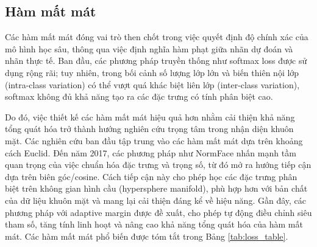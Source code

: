 \subsection{Hàm mất mát}
Các hàm mất mát đóng vai trò then chốt trong việc quyết định độ chính xác của mô hình học sâu, thông qua việc định nghĩa hàm phạt giữa nhãn dự đoán và nhãn thực tế\cite{sota_GUO2019102805}. Ban đầu, các phương pháp truyền thống như softmax loss được sử dụng rộng rãi; tuy nhiên, trong bối cảnh số lượng lớp lớn và biến thiên nội lớp (intra-class variation) có thể vượt quá khác biệt liên lớp (inter-class variation), softmax không đủ khả năng tạo ra các đặc trưng có tính phân biệt cao\cite{20_WANG2021215}.

Do đó, việc thiết kế các hàm mất mát hiệu quả hơn nhằm cải thiện khả năng tổng quát hóa trở thành hướng nghiên cứu trọng tâm trong nhận diện khuôn mặt. Các nghiên cứu ban đầu tập trung vào các hàm mất mát dựa trên khoảng cách Euclid. Đến năm 2017, các phương pháp như NormFace nhấn mạnh tầm quan trọng của việc chuẩn hóa đặc trưng và trọng số, từ đó mở ra hướng tiếp cận dựa trên biên góc/cosine\cite{23_meng_2021_magface}. Cách tiếp cận này cho phép học các đặc trưng phân biệt trên không gian hình cầu (hypersphere manifold), phù hợp hơn với bản chất của dữ liệu khuôn mặt và mang lại cải thiện đáng kể về hiệu năng\cite{20_WANG2021215}. Gần đây, các phương pháp với adaptive margin được đề xuất, cho phép tự động điều chỉnh siêu tham số, tăng tính linh hoạt và nâng cao khả năng tổng quát hóa của hàm mất mát\cite{23_meng_2021_magface}. Các hàm mất mát phổ biến được tóm tắt trong Bảng \ref{tab:loss_table}.

